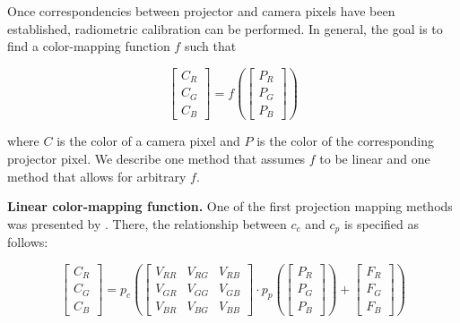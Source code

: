 Once correspondencies between projector and camera pixels have been established, radiometric calibration can be performed. In general, the goal is to find a color-mapping function \(f\) such that

\begin{equation}
    \label{eq:radiometric_calibration}
    \begin{bmatrix}
        C_R \\
        C_G \\
        C_B
    \end{bmatrix} = f(
        \begin{bmatrix}
            P_R \\
            P_G \\
            P_B
        \end{bmatrix}
    )
\end{equation}

where \(C\) is the color of a camera pixel and \(P\) is the color of the corresponding projector pixel. We describe one method that assumes \(f\) to be linear and one method that allows for arbitrary \(f\).

\textbf{Linear color-mapping function.} One of the first projection mapping methods was presented by \citet{Grossberg2004}. There, the relationship between \(c_c\) and \(c_p\) is specified as follows:

\begin{equation}
    \label{eq:linear_color_mapping}
    \begin{bmatrix}
        C_R \\
        C_G \\
        C_B
    \end{bmatrix} = p_c(
        \begin{bmatrix}
            V_{RR} & V_{RG} & V_{RB} \\
            V_{GR} & V_{GG} & V_{GB} \\
            V_{BR} & V_{BG} & V_{BB}
        \end{bmatrix} \cdot p_p(
            \begin{bmatrix}
                P_R \\
                P_G \\
                P_B
            \end{bmatrix}
        ) +
        \begin{bmatrix}
            F_R \\
            F_G \\
            F_B
        \end{bmatrix}
    )
\end{equation}

